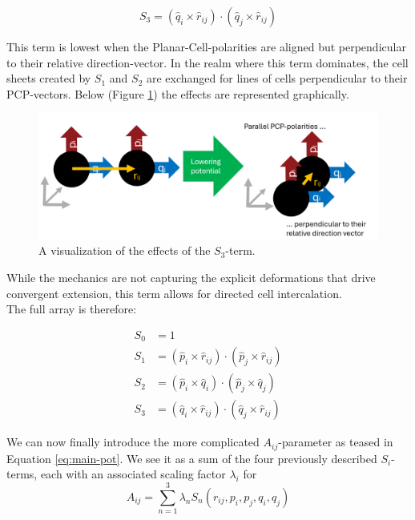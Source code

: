 \begin{equation*}
    S_3=\left(\hat{q}_i \times \hat{r}_{i j}\right) \cdot\left(\hat{q}_j \times \hat{r}_{i j}\right)
\end{equation*}

This term is lowest when the Planar-Cell-polarities are aligned but perpendicular to their relative direction-vector. In the realm where this term dominates, the cell sheets created by $S_1$ and $S_2$ are exchanged for lines of cells perpendicular to their PCP-vectors.  Below (Figure \ref{fig:expl-s3}) the effects are represented graphically.
\begin{figure}[H]
    \centering
    \includegraphics[width=1\linewidth]{chapters//Theory//figures/explainS3.png}
    \caption{A visualization of the effects of the $S_3$-term.}
    
    \label{fig:expl-s3}
\end{figure}

While the mechanics are not capturing the explicit deformations that drive  convergent extension, this term allows for directed cell intercalation.\\

The full array is therefore:

\begin{subequations}
\begin{align}
S_0&=1\label{eq:s0}\\
S_1&=\left(\hat{p}_i \times \hat{r}_{i j}\right) \cdot\left(\hat{p}_j \times \hat{r}_{i j}\right)\label{eq:s1}\\
S_2&=\left(\hat{p}_i \times \hat{q}_{i}\right) \cdot\left(\hat{p}_j \times \hat{q}_{j}\right)\label{eq:s2}\\
S_3&=\left(\hat{q}_i \times \hat{r}_{i j}\right) \cdot\left(\hat{q}_j \times \hat{r}_{i j}\right)\label{eq:s3}
\end{align}
\end{subequations}


We can now finally introduce the more complicated $A_{ij}$-parameter as teased in Equation \ref{eq:main-pot}. We see it as a sum of the four previously described $S_i$-terms, each with an associated scaling factor $\lambda_i$ for  
\begin{equation}
    A_{ij}=\sum_{n=1}^{3}\lambda_n  S_n(r_{ij}, p_i, p_j, q_i, q_j)
\end{equation}


